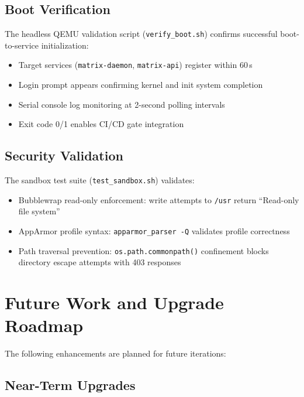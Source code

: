 \documentclass[conference]{IEEEtran}
\begin{document}
\subsection{Boot Verification}

The headless QEMU validation script (\texttt{verify\_boot.sh}) confirms successful boot-to-service initialization:
\begin{itemize}
    \item Target services (\texttt{matrix-daemon}, \texttt{matrix-api}) register within 60\,s
    \item Login prompt appears confirming kernel and init system completion
    \item Serial console log monitoring at 2-second polling intervals
    \item Exit code 0/1 enables CI/CD gate integration
\end{itemize}

\subsection{Security Validation}

The sandbox test suite (\texttt{test\_sandbox.sh}) validates:
\begin{itemize}
    \item Bubblewrap read-only enforcement: write attempts to \texttt{/usr} return ``Read-only file system''
    \item AppArmor profile syntax: \texttt{apparmor\_parser -Q} validates profile correctness
    \item Path traversal prevention: \texttt{os.path.commonpath()} confinement blocks directory escape attempts with 403 responses
\end{itemize}


\section{Future Work and Upgrade Roadmap}
\label{sec:future}

The following enhancements are planned for future iterations:

\subsection{Near-Term Upgrades}
\end{document}
